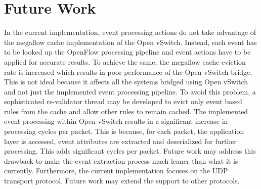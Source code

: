 \section{Future Work}
In the current implementation, event processing actions do not take advantage of the megaflow cache implementation of the Open vSwitch. Instead, each event has to be looked up the OpenFlow processing pipeline and event actions have to be applied for accurate results. To achieve the same, the megaflow cache eviction rate is increased which results in poor performance of the Open vSwitch bridge. This is not ideal because it affects all the systems bridged using Open vSwitch and not just the implemented event processing pipeline. To avoid this problem, a sophisticated re-validator thread may be developed to evict only event based rules from the cache and allow other rules to remain cached. \newline
The implemented event processing within Open vSwitch results in a significant increase in processing cycles per packet. This is because, for each packet, the application layer is accessed, event attributes are extracted and deserialized for further processing. This adds significant cycles per packet. Future work may address this drawback to make the event extraction process much leaner than what it is currently.\newline
Furthermore, the current implementation focuses on the UDP transport protocol. Future work may extend the support to other protocols.